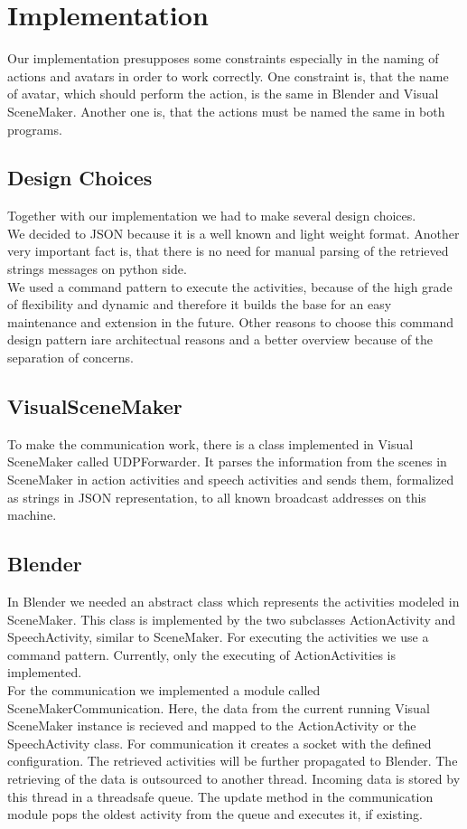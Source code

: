 \documentclass[
10pt, %
a4paper, %
oneside,
headinclude,footinclude, %
BCOR5mm, %
]{scrartcl}
\begin{document}

\section{Implementation}
Our implementation presupposes some constraints especially in the naming of actions and avatars in order to work correctly.
One constraint is, that the name of avatar, which should perform the action, is the same in Blender and Visual SceneMaker. Another one is, that the actions must be named the same in both programs. %

\subsection{Design Choices}
Together with our implementation we had to make several design choices.\\
We decided to JSON because it is a well known and light weight format. Another very important fact is, that there is no need for manual parsing of the retrieved strings messages on python side.\\
We used a command pattern to execute the activities, because of the high grade of flexibility and dynamic and therefore it builds the base for an easy maintenance and extension in the future. Other reasons to choose this command design pattern iare architectual reasons and a better overview because of the separation of concerns.

\subsection{VisualSceneMaker}
To make the communication work, there is a class implemented in Visual SceneMaker called UDPForwarder. It parses the information from the scenes in SceneMaker in action activities and speech activities and sends them, formalized as strings in JSON representation, to all known broadcast addresses on this machine. 

\subsection{Blender}
In Blender we needed an abstract class which represents the activities modeled in SceneMaker. This class is implemented by the two subclasses  ActionActivity and SpeechActivity, similar to SceneMaker. For executing the activities we use a command pattern. Currently, only the executing of ActionActivities is implemented.\\
For the communication we implemented a module called SceneMakerCommunication. Here, the data from the current running Visual SceneMaker instance is recieved and mapped to the ActionActivity or the SpeechActivity class. For communication it creates a socket with the defined configuration. The retrieved
activities will be further propagated to Blender. The retrieving of the data is outsourced to another thread. Incoming data is stored by this thread in a threadsafe queue. The update method in the communication module pops the oldest activity from the queue and executes it, if existing.
\end{document}
